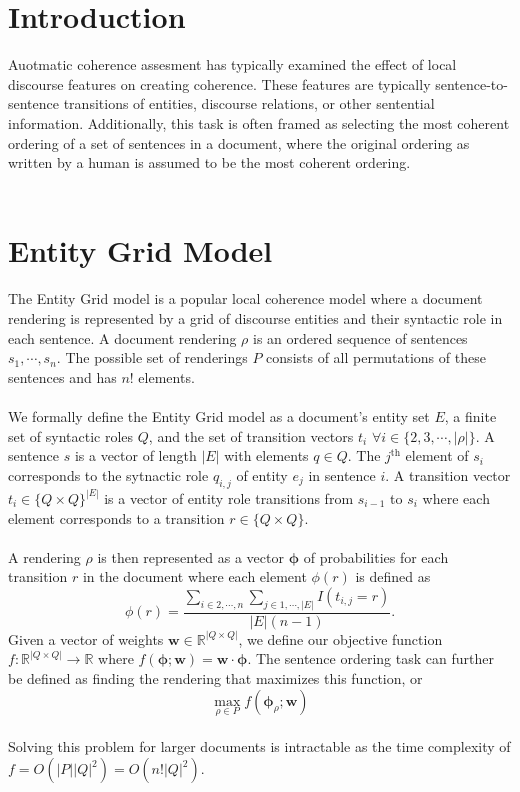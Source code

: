 \documentclass{article}
\newcommand{\entities}{E}
\newcommand{\roles}{Q}
\newcommand{\role}{q}
\newcommand{\tv}{t}
\newcommand{\sent}{s}
\newcommand{\weight}{\mathbf{w}}
\newcommand{\rendering}{\rho}
\newcommand{\renderings}{P}
\newcommand{\trans}{r}
\newcommand{\obj}{f}
\begin{document}
\section{Introduction}
Auotmatic coherence assesment has typically examined the effect of local discourse features on creating coherence. These features are typically sentence-to-sentence transitions of entities, discourse relations, or other sentential information. 
Additionally, this task is often framed as selecting the most coherent ordering of a set of sentences in a document, where the original ordering as written by a human is assumed to be the most coherent ordering.\\\\
\section{Entity Grid Model}
The Entity Grid model is a popular local coherence model where a document rendering is represented by a grid of discourse entities and their syntactic role in each sentence. A document rendering $\rendering$ is an ordered sequence of sentences $\sent_1, \cdots, \sent_n$.
The possible set of renderings $\renderings$ consists of all permutations of these sentences and has $n!$ elements.\\\\ 
\indent We formally define the Entity Grid model as a document's entity set $\entities$, a finite set of syntactic roles $\roles$, and the set of transition vectors $\tv_i$  $ \forall i \in \{ 2, 3, \cdots, |\rendering|\}$. 
A sentence $\sent$ is a vector of length $|\entities|$ with elements $\role \in \roles$.
The $j^{\textrm{th}}$ element of $\sent_i$ corresponds to the sytnactic role $\role_{i,j}$ of entity $e_j$ in sentence $i$.
A transition vector $\tv_i \in \{\roles\times\roles\}^{|\entities|}$ is a vector of entity role transitions from $\sent_{i-1}$ to $\sent_i$ where each element corresponds to a transition   $\trans \in \{\roles\times\roles\}$.
\\\\
\indent A rendering $\rendering$ is then represented as a vector $\boldsymbol{\phi}$ of probabilities for each transition $\trans$ in the document where each element $\phi(r)$ is defined as  
\begin{equation}
\phi(\trans) = \frac{\sum_{i \in 2,\cdots, n}\sum_{j\in1,\cdots,|\entities|} I(\tv_{i,j}= r)  }{|\entities|(n-1)}. 
\end{equation}
Given a vector of weights $\mathbf{w} \in \mathbb{R}^{|\roles\times\roles|}$, we define our objective function $\obj : \mathbb{R}^{|\roles\times\roles|}  \rightarrow \mathbb{R}$ where $\obj(\boldsymbol{\phi};\weight) = \weight\cdot\boldsymbol{\phi}$. 
The sentence ordering task can further be defined as finding the rendering that maximizes this function, or
\begin{equation}
\max_{\rendering \in \renderings} \obj(\boldsymbol{\phi}_\rendering ; \weight )
\end{equation}
\\
Solving this problem for larger documents is intractable as the time complexity of $\obj = O(|\renderings||\roles|^2) = O(n!|\roles|^2)$.
\end{document}
